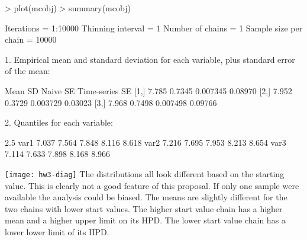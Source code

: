 \documentclass{article}
\begin{document}
\begin{Schunk}
\begin{Sinput}
> plot(mcobj)
> summary(mcobj)
\end{Sinput}
\begin{Soutput}
Iterations = 1:10000
Thinning interval = 1 
Number of chains = 1 
Sample size per chain = 10000 

1. Empirical mean and standard deviation for each variable,
   plus standard error of the mean:

      Mean     SD Naive SE Time-series SE
[1,] 7.785 0.7345 0.007345        0.08970
[2,] 7.952 0.3729 0.003729        0.03023
[3,] 7.968 0.7498 0.007498        0.09766

2. Quantiles for each variable:

      2.5%   25%   50%   75% 97.5%
var1 7.037 7.564 7.848 8.116 8.618
var2 7.216 7.695 7.953 8.213 8.654
var3 7.114 7.633 7.898 8.168 8.966
\end{Soutput}
\end{Schunk}
\texttt{[image: hw3-diag]}
The distributions all look different based on the starting value. This is clearly not a good feature of this proposal. If only one sample were available the analysis could be biased. The means are slightly different for the two chains with lower start values. The higher start value chain has a higher mean and a higher upper limit on its HPD. The lower start value chain has a lower lower limit of its HPD. 
\end{document}
